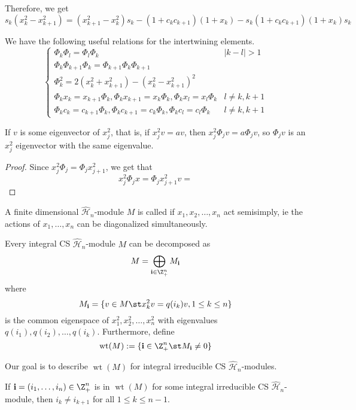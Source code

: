 \documentclass[11pt,leqno,oneside]{amsbook}
\renewcommand{\H}{\mathcal{H}}
\DeclareMathOperator{\wt}{wt}
\renewcommand{\vec}[1]{\mathbf{#1}}
\numberwithin{thm}{section}
\begin{document}
Therefore, we get \[
  s_k(x_k^2-x_{k+1}^2) = (x_{k+1}^2-x_k^2)s_k - (1+c_k c_{k+1})(1+x_k)
  - s_k (1+c_k c_{k+1})(1+x_k) s_k
\]
\begin{prop}
We have the following useful relations for the intertwining elements.
\[
  \begin{cases}
    \Phi_k \Phi_l = \Phi_l \Phi_k & |k-l| > 1\\
    \Phi_k \Phi_{k+1} \Phi_k = \Phi_{k+1} \Phi_k \Phi_{k+1}\\
    \Phi_k^2 = 2(x_k^2+x_{k+1}^2) - (x_k^2 - x_{k+1}^2)^2\\
    \Phi_k x_k = x_{k+1} \Phi_k, \Phi_k x_{k+1} = x_k \Phi_k, \Phi_k
    x_l = x_l \Phi_k & l \neq k,k+1\\
    \Phi_k c_k = c_{k+1} \Phi_k, \Phi_k c_{k+1} = c_k \Phi_k, \Phi_k
    c_l = c_l \Phi_k & l \neq k,k+1
  \end{cases}
\]
\end{prop}
\begin{prop}
  If \(v\) is some eigenvector of \(x_j^2\), that is, if \(x_j^2 v
= av\), then \(x_j^2 \Phi_j v = a \Phi_j v\), so \(\Phi_j v\) is an
\(x_j^2\) eigenvector with the same eigenvalue.
\end{prop}
\begin{proof}
  Since \(x_j^2 \Phi_j = \Phi_j x_{j+1}^2\), we get that \[
    x_j^2 \Phi_j x = \Phi_j x_{j+1}^2 v =
  \]
\end{proof}
\begin{defn}
  A finite dimensional \(\hat{\H}_n\)-module \(M\) is called
   if \(x_1, x_2, \ldots, x_n\) act
  semisimply, ie the actions of \(x_1, \ldots, x_n\) can be
  diagonalized simultaneously.
\end{defn}
\begin{prop}
  Every integral CS \(\hat{\H}_n\)-module \(M\) can be decomposed
  as \[
    M = \bigoplus_{\vec{i} \in \Z_+^n} M_{\vec{i}}
  \]
  where \[
    M_{\vec{i}} = \{v \in M \st x_k^2 v = q(i_k)v, 1 \leq k \leq n\}
  \]
  is the common eigenspace of \(x_1^2, x_2^2, \ldots, x_n^2\) with
  eigenvalues \(q(i_1), q(i_2), \ldots, q(i_k)\). Furthermore,
  define \[
    \wt(M) := \{\vec{i} \in \Z_+^n \st M_{\vec{i}} \neq 0\}
  \]
\end{prop}
Our goal is to describe \(\wt(M)\) for integral irreducible CS
\(\hat{\H}_n\)-modules.
\begin{lem}
  If \(\vec{i} = (i_1, \ldots, i_n) \in \Z_+^n\) is in \(\wt(M)\) for
  some integral irreducible CS \(\hat{\H}_n\)-module, then \(i_k \neq
  i_{k+1}\) for all \(1 \leq k \leq n-1\).
\end{lem}
\end{document}
